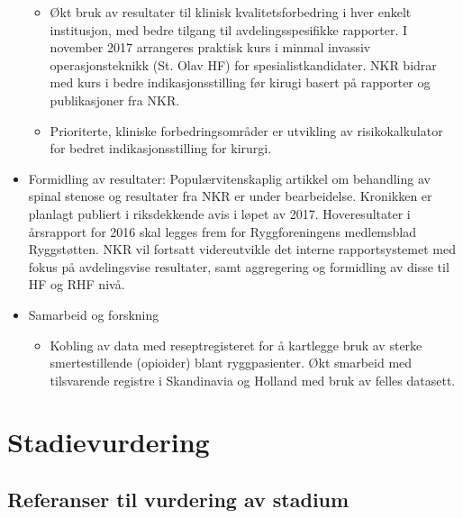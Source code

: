 \documentclass[norsk, a4paper, twocolumn]{report}
\begin{document}
\begin{itemize}
\begin{itemize}
  
      \item Økt bruk av resultater til klinisk kvalitetsforbedring i hver
        enkelt institusjon, med bedre tilgang til avdelingsspesifikke rapporter. I november 2017 arrangeres praktisk kurs i minmal invassiv operasjonsteknikk (St. Olav HF) for spesialistkandidater. NKR bidrar med kurs i bedre indikasjonsstilling før kirugi basert på rapporter og publikasjoner fra NKR.
      \item Prioriterte, kliniske forbedringsområder er utvikling av risikokalkulator for bedret indikasjonsstilling for kirurgi.
    \end{itemize}
  \item Formidling av resultater: Populærvitenskaplig artikkel om behandling av spinal stenose og resultater fra NKR er under bearbeidelse. Kronikken er planlagt publiert i riksdekkende avis i løpet av 2017. Hoveresultater i årsrapport for 2016 skal legges frem for Ryggforeningens medlemsblad  Ryggstøtten. NKR vil fortsatt videreutvikle det interne rapportsystemet med fokus på avdelingsvise resultater, samt aggregering og formidling av disse til HF og RHF nivå.  

  \item Samarbeid og forskning
    \begin{itemize}
      \item Kobling av data med reseptregisteret for å kartlegge bruk av sterke smertestillende (opioider) blant ryggpasienter. Økt smarbeid med tilsvarende registre i Skandinavia og Holland med bruk av felles datasett.
         \end{itemize}
\end{itemize}




\part{Stadievurdering}


\chapter{Referanser til vurdering av stadium}


\bigskip
\bigskip
\end{document}

